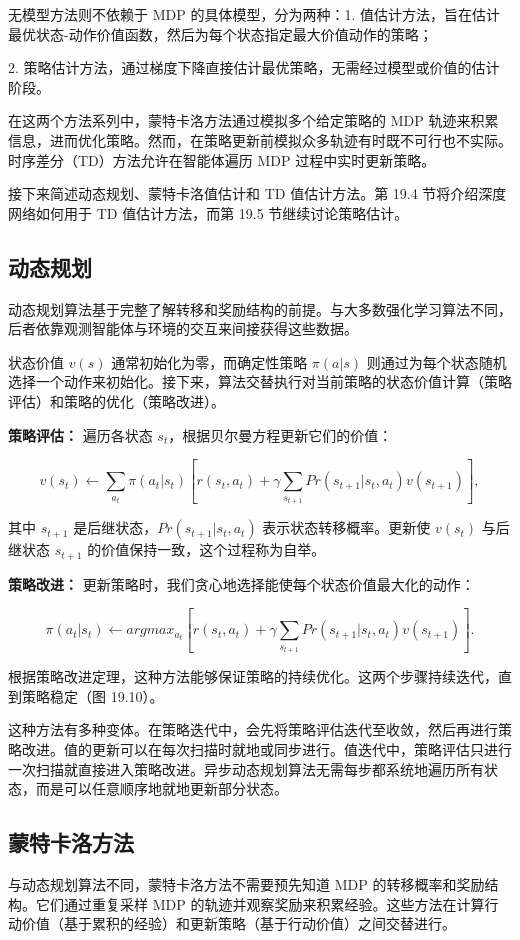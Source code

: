 无模型方法则不依赖于 MDP 的具体模型，分为两种：1. 值估计方法，旨在估计最优状态-动作价值函数，然后为每个状态指定最大价值动作的策略；

2. 策略估计方法，通过梯度下降直接估计最优策略，无需经过模型或价值的估计阶段。

在这两个方法系列中，蒙特卡洛方法通过模拟多个给定策略的 MDP 轨迹来积累信息，进而优化策略。然而，在策略更新前模拟众多轨迹有时既不可行也不实际。时序差分（TD）方法允许在智能体遍历 MDP 过程中实时更新策略。

接下来简述动态规划、蒙特卡洛值估计和 TD 值估计方法。第 19.4 节将介绍深度网络如何用于 TD 值估计方法，而第 19.5 节继续讨论策略估计。


\subsection{动态规划}
动态规划算法基于完整了解转移和奖励结构的前提。与大多数强化学习算法不同，后者依靠观测智能体与环境的交互来间接获得这些数据。

状态价值 \(v(s)\) 通常初始化为零，而确定性策略 \(\pi(a|s)\) 则通过为每个状态随机选择一个动作来初始化。接下来，算法交替执行对当前策略的状态价值计算（策略评估）和策略的优化（策略改进）。

\textbf{策略评估：} 遍历各状态 \(s_t\)，根据贝尔曼方程更新它们的价值：

\[
v(s_t) \leftarrow \sum_{a_t} \pi(a_t|s_t) \left[ r(s_t, a_t) + \gamma \sum_{s_{t+1}} Pr(s_{t+1}|s_t, a_t)v(s_{t+1}) \right], \tag{19.11}
\]

其中 \(s_{t+1}\) 是后继状态，\(Pr(s_{t+1}|s_t, a_t)\) 表示状态转移概率。更新使 \(v(s_t)\) 与后继状态 \(s_{t+1}\) 的价值保持一致，这个过程称为自举。

\textbf{策略改进：} 更新策略时，我们贪心地选择能使每个状态价值最大化的动作：

\[
\pi(a_t|s_t) \leftarrow argmax_{a_t} \left[ r(s_t, a_t) + \gamma \sum_{s_{t+1}} Pr(s_{t+1}|s_t, a_t)v(s_{t+1}) \right]. \tag{19.12}
\]

根据策略改进定理，这种方法能够保证策略的持续优化。这两个步骤持续迭代，直到策略稳定（图 19.10）。

这种方法有多种变体。在策略迭代中，会先将策略评估迭代至收敛，然后再进行策略改进。值的更新可以在每次扫描时就地或同步进行。值迭代中，策略评估只进行一次扫描就直接进入策略改进。异步动态规划算法无需每步都系统地遍历所有状态，而是可以任意顺序地就地更新部分状态。

\subsection{蒙特卡洛方法}
与动态规划算法不同，蒙特卡洛方法不需要预先知道 MDP 的转移概率和奖励结构。它们通过重复采样 MDP 的轨迹并观察奖励来积累经验。这些方法在计算行动价值（基于累积的经验）和更新策略（基于行动价值）之间交替进行。

